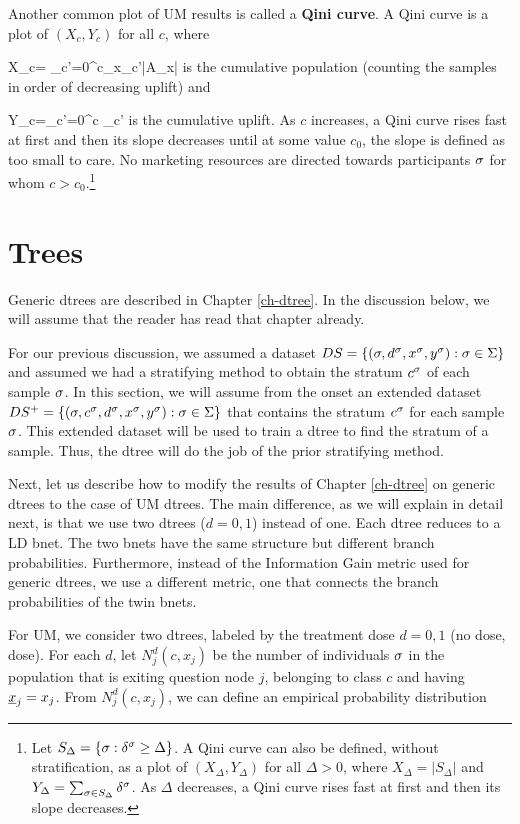 \documentclass[12pt]{report}
\begin{document}
Another common plot of UM results is
called a {\bf Qini
curve}.
A Qini curve is a plot
of $(X_c,Y_c)$
for all $c$, where

\beq
X_c= \sum_{c'=0}^{c}\sum_{x\in \calx_{c'}}|A_x|
\eeq
is the cumulative population (counting the
samples in
order of decreasing uplift) and

\beq
Y_c=\sum_{c'=0}^c \Delta_{c'}
\eeq
is the cumulative uplift.
As $c$ increases, a Qini curve rises fast at first and then its slope decreases until
at some value $c_0$, the slope is defined as too small to care. No marketing resources are
directed towards
participants $\sigma$ for whom  $c>c_0$.\footnote{
Let
$S_{\Delta} = \{\sigma:\delta^\sigma \geq \Delta\}$.
A Qini curve can also be defined, without stratification,
as a
 plot of $(X_\Delta, Y_\Delta)$ for all $\Delta>0$,
where $
X_\Delta = |S_{\Delta}|$
and
$
Y_\Delta= \sum_{\sigma\in S_{\Delta}}\delta^\sigma
$. As $\Delta$ decreases, a Qini curve rises fast at first and then its slope decreases.
}

\section{Trees}

Generic dtrees are
described in Chapter \ref{ch-dtree}.
In the discussion below, we will assume that the reader has read
that chapter already.

For our previous discussion,
we assumed a dataset
$DS= \{ (\sigma, d^\sigma, x^\sigma, y^\sigma):
 \sigma\in\Sigma\}$ and
 assumed we had a stratifying
 method to obtain the stratum
 $c^\sigma$ of each sample $\sigma$.
In this section, we will assume
from the onset an
extended dataset
$DS^+= \{ (\sigma, c^\sigma, d^\sigma, x^\sigma, y^\sigma):
 \sigma\in\Sigma\}$
that contains the stratum $c^\sigma$ for each sample $\sigma$.
This extended dataset will be used
to train a dtree to find the stratum of
a sample. Thus, the dtree will
do the job of the prior stratifying method.

Next,
let us describe how to
modify the results
of Chapter \ref{ch-dtree}
on generic dtrees
to the case of UM dtrees.
The main difference,
as we will
explain in detail
next,
is that we use two dtrees ($d=0,1$) instead
of one. Each dtree reduces to a LD bnet. The two
bnets have the same structure but
different branch probabilities.
Furthermore, instead of the Information
Gain metric
used for generic dtrees,
we use a different
metric, one
that connects the branch probabilities
of the twin bnets.

For UM, we consider two dtrees,
labeled by the treatment dose $d=0,1$ (no dose, dose).
For each $d$, let $N_j^d(c, x_j)$ be the number
of individuals $\sigma$
in the population that is exiting question node $j$,
belonging to class $c$ and having $\rvx_j=x_j$.
From $N_j^d(c, x_j)$, we can define
an empirical
probability distribution
\end{document}
